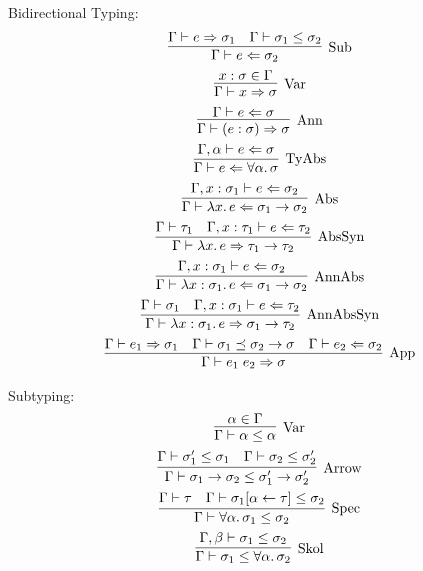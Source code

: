 Bidirectional Typing:
\begin{gather*}
  \infer[\text{Sub}]{
    \Gamma \vdash e \Leftarrow \sigma_2
  }{
    \Gamma \vdash e \Rightarrow \sigma_1
    &
    \Gamma \vdash \sigma_1 \leq \sigma_2
  }
  \\
  \infer[\text{Var}]{
    \Gamma \vdash x \Rightarrow \sigma
  }{
    x: \sigma \in \Gamma
  }
  \\
  \infer[\text{Ann}]{
    \Gamma \vdash (e: \sigma) \Rightarrow \sigma
  }{
    \Gamma \vdash e \Leftarrow \sigma
  }
  \\
  \infer[\text{TyAbs}]{
    \Gamma \vdash e \Leftarrow \forall \alpha\ldotp \sigma
  }{
    \Gamma, \alpha \vdash e \Leftarrow \sigma
  }
  \\
  \infer[\text{Abs}]{
    \Gamma \vdash \lambda x\ldotp e \Leftarrow \sigma_1 \to \sigma_2
  }{
    \Gamma, x: \sigma_1 \vdash e \Leftarrow \sigma_2
  }
  \\
  \infer[\text{AbsSyn}]{
    \Gamma \vdash \lambda x\ldotp e \Rightarrow \tau_1 \to \tau_2
  }{
    \Gamma \vdash \tau_1
    &
    \Gamma, x: \tau_1 \vdash e \Leftarrow \tau_2
  }
  \\
  \infer[\text{AnnAbs}]{
    \Gamma \vdash \lambda x: \sigma_1\ldotp e \Leftarrow \sigma_1 \to \sigma_2
  }{
    \Gamma, x: \sigma_1 \vdash e \Leftarrow \sigma_2
  }
  \\
  \infer[\text{AnnAbsSyn}]{
    \Gamma \vdash \lambda x: \sigma_1\ldotp e \Rightarrow \sigma_1 \to \tau_2
  }{
    \Gamma \vdash \sigma_1
    &
    \Gamma, x: \sigma_1 \vdash e \Leftarrow \tau_2
  }
  \\
  \infer[\text{App}]{
    \Gamma \vdash e_1\; e_2 \Rightarrow \sigma
  }{
    \Gamma \vdash e_1 \Rightarrow \sigma_1
    &
    \Gamma \vdash \sigma_1 \preceq \sigma_2 \to \sigma
    &
    \Gamma \vdash e_2 \Leftarrow \sigma_2
  }
\end{gather*}

Subtyping:
\begin{gather*}
  \infer[\text{Var}]{
    \Gamma \vdash \alpha \leq \alpha
  }{
    \alpha \in \Gamma
  }
  \\
  \infer[\text{Arrow}]{
    \Gamma \vdash \sigma_1 \to \sigma_2 \leq \sigma'_1 \to \sigma'_2
  }{
    \Gamma \vdash \sigma'_1 \leq \sigma_1
    &
    \Gamma \vdash \sigma_2 \leq \sigma'_2
  }
  \\
  \infer[\text{Spec}]{
    \Gamma \vdash \forall \alpha\ldotp \sigma_1 \leq \sigma_2
  }{
    \Gamma \vdash \tau
    &
    \Gamma \vdash \sigma_1[\alpha \assign \tau] \leq \sigma_2
  }
  \\
  \infer[\text{Skol}]{
    \Gamma \vdash \sigma_1 \leq \forall \alpha\ldotp \sigma_2
  }{
    \Gamma, \beta \vdash \sigma_1 \leq \sigma_2
  }
\end{gather*}

